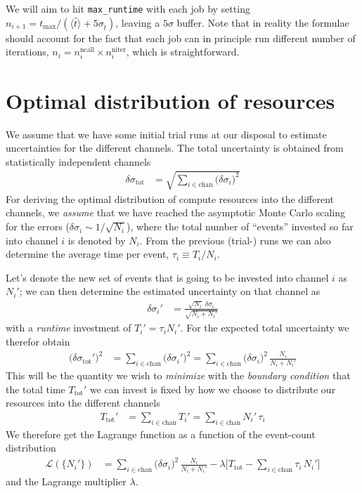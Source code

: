 \documentclass[11pt]{article}
\begin{document}
We will aim to hit \texttt{max\_runtime} with each job by setting \(n_{i+1} = t_\mathrm{max} / (\langle\hat{t}\rangle + 5\sigma_{\hat{t}})\), leaving a \(5\sigma\) buffer.
Note that in reality the formulae should account for the fact that each job can in principle run different number of iterations, \(n_i = n_i^\mathrm{ncall} \times n_i^\mathrm{niter}\), which is straightforward.
\section{Optimal distribution of resources}
\label{sec:org6731aa1}
We assume that we have some initial trial runs at our disposal to estimate uncertainties for the different channels.
The total uncertainty is obtained from statistically independent channels
\begin{align}
  \delta\sigma_\mathrm{tot}
  &=
  \sqrt{\sum_{i\in\mathrm{chan}}\bigl(\delta\sigma_i\bigr)^2}
\end{align}
For deriving the optimal distribution of compute resources into the different channels, we \emph{assume} that we have reached the asymptotic Monte Carlo scaling for the errors (\(\delta\sigma_i \sim 1/\sqrt{N_i}\)), where the total number of ``events'' invested so far into channel \(i\) is denoted by \(N_i\).
From the previous (trial-) runs we can also determine the average time per event, \(\tau_i \equiv T_i / N_i\).

Let's denote the new set of events that is going to be invested into channel \(i\) as \(N_i'\); we can then determine the estimated uncertainty on that channel as
\begin{align}
  \delta\sigma_i'
  &=
  \frac{\sqrt{N_i}\;\delta\sigma_i}{\sqrt{N_i+N_i'}}
\end{align}
with a \emph{runtime} investment of \(T_i' = \tau_i N_i'\).
For the expected total uncertainty we therefor obtain
\begin{align}
  \bigl(\delta\sigma_\mathrm{tot}'\bigr)^2
  &=
  \sum_{i\in\mathrm{chan}} \bigl(\delta\sigma_i'\bigr)^2
  =
  \sum_{i\in\mathrm{chan}} \bigl(\delta\sigma_i\bigr)^2 \, \frac{N_i}{N_i+N_i'}
\end{align}
This will be the quantity we wish to \emph{minimize} with the \emph{boundary condition} that the total time \(T_\mathrm{tot}'\) we can invest is fixed by how we choose to distribute our resources into the different channels
\begin{align}
  T_\mathrm{tot}'
  &=
  \sum_{i\in\mathrm{chan}} T_i'
  =
  \sum_{i\in\mathrm{chan}} N_i' \, \tau_i
\end{align}
We therefore get the Lagrange function as a function of the event-count distribution
\begin{align}
  \mathcal{L}(\{N_i'\})
  &=
  \sum_{i\in\mathrm{chan}} \bigl(\delta\sigma_i\bigr)^2 \, \frac{N_i}{N_i+N_i'}
  - \lambda \biggl[ T_\mathrm{tot} - \sum_{i\in\mathrm{chan}} \tau_i \, N_i' \biggr]
\end{align}
and the Lagrange multiplier \(\lambda\).
\end{document}
